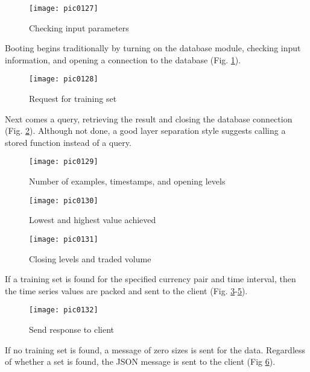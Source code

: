 \begin{figure}[h]
\centering
\texttt{[image: pic0127]}
\caption{Checking input parameters}
\label{fig:pic0127}
\end{figure}
\FloatBarrier

Booting begins traditionally by turning on the database module, checking input information, and opening a connection to the database (Fig. \ref{fig:pic0127}).

\begin{figure}[h]
\centering
\texttt{[image: pic0128]}
\caption{Request for training set}
\label{fig:pic0128}
\end{figure}
\FloatBarrier

Next comes a query, retrieving the result and closing the database connection (Fig. \ref{fig:pic0128}). Although not done, a good layer separation style suggests calling a stored function instead of a query.

\begin{figure}[h]
\centering
\texttt{[image: pic0129]}
\caption{Number of examples, timestamps, and opening levels}
\label{fig:pic0129}
\end{figure}
\FloatBarrier

\begin{figure}[h]
\centering
\texttt{[image: pic0130]}
\caption{Lowest and highest value achieved}
\label{fig:pic0130}
\end{figure}
\FloatBarrier

\begin{figure}[h]
\centering
\texttt{[image: pic0131]}
\caption{Closing levels and traded volume}
\label{fig:pic0131}
\end{figure}
\FloatBarrier

If a training set is found for the specified currency pair and time interval, then the time series values are packed and sent to the client (Fig. \ref{fig:pic0129}-\ref{fig:pic0131}).

\begin{figure}[h]
\centering
\texttt{[image: pic0132]}
\caption{Send response to client}
\label{fig:pic0132}
\end{figure}
\FloatBarrier

If no training set is found, a message of zero sizes is sent for the data. Regardless of whether a set is found, the JSON message is sent to the client (Fig \ref{fig:pic0132}).


